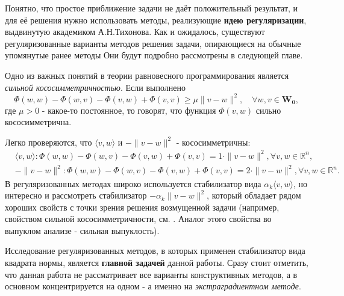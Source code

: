 	 Понятно, что простое приближение задачи не даёт положительный результат, и для её решения нужно использовать методы, реализующие \textbf{идею регуляризации}, выдвинутую академиком А.Н.Тихонова. Как и ожидалось, существуют регуляризованные варианты методов решения задачи, опирающиеся на обычные упомянутые ранее методы Они будут подробно рассмотрены в следующей главе.
	 
	 Одно из важных понятий в теории равновесного программирования является \textit{сильной кососимметричностью}. Если выполнено
	 	\begin{equation*}
	 	\label{strong-koso}
	 	\Phi(w,w)-\Phi(w,v)-\Phi(v,w)+\Phi(v,v)\geqslant \mu\|v-w\|^2,\quad \forall w,v\in\mathbf{W_0},
	 	\end{equation*}
	 где $\mu>0$ - какое-то постоянное, то говорят, что функция $\Phi(v,w)$ сильно кососимметрична. 
	 
	 Легко проверяются, что $\langle v,w\rangle$ и $-\|v-w\|^2$ - кососимметричны:
	 \begin{equation*}
	 \begin{aligned}
	 &\langle v,w\rangle:\Phi(w,w)-\Phi(w,v)-\Phi(v,w)+\Phi(v,v)=1\cdot \|v-w\|^2,\forall v,w\in \mathbb{R}^n,\\
	 & -\|v-w\|^2:\Phi(w,w)-\Phi(w,v)-\Phi(v,w)+\Phi(v,v)=2\cdot\|v-w\|^2,\forall v,w\in \mathbb{R}^n.
	 \end{aligned}
	 \end{equation*}
	 В регуляризованных методах широко используется стабилизатор вида $\alpha_k\langle v,w\rangle$, но интересно и рассмотреть стабилизатор $-\alpha_k\| v-w\|^2$, который обладает рядом хороших свойств с точки зрения решения возмущенной задачи (например, свойством сильной кососимметричности, см. \cite{6}. Аналог этого свойства во выпуклом анализе - сильная выпуклость). 
	 
	 Исследование регуляризованных методов, в которых применен стабилизатор вида квадрата нормы, является \textbf{главной задачей} данной работы. Сразу стоит отметить, что данная работа не рассматривает все варианты конструктивных методов, а в основном концентрируется на одном - а именно на \textit{экстраградиентном методе}. 

\clearpage
